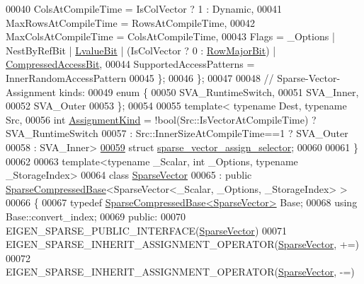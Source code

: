 \begin{DoxyCode}
00040     ColsAtCompileTime = IsColVector ? 1 : Dynamic,
00041     MaxRowsAtCompileTime = RowsAtCompileTime,
00042     MaxColsAtCompileTime = ColsAtCompileTime,
00043     Flags = \_Options | NestByRefBit | \hyperlink{group__flags_gae2c323957f20dfdc6cb8f44428eaec1a}{LvalueBit} | (IsColVector ? 0 : 
      \hyperlink{group__flags_gae4f56c2a60bbe4bd2e44c5b19cbe8762}{RowMajorBit}) | \hyperlink{group__flags_gaed0244284da47a2b8661261431173caf}{CompressedAccessBit},
00044     SupportedAccessPatterns = InnerRandomAccessPattern
00045   \};
00046 \};
00047 
00048 \textcolor{comment}{// Sparse-Vector-Assignment kinds:}
00049 \textcolor{keyword}{enum} \{
00050   SVA\_RuntimeSwitch,
00051   SVA\_Inner,
00052   SVA\_Outer
00053 \};
00054 
00055 \textcolor{keyword}{template}< \textcolor{keyword}{typename} Dest, \textcolor{keyword}{typename} Src,
00056           \textcolor{keywordtype}{int} \hyperlink{struct_eigen_1_1internal_1_1_assignment_kind}{AssignmentKind} = !bool(Src::IsVectorAtCompileTime) ? SVA\_RuntimeSwitch
00057                              : Src::InnerSizeAtCompileTime==1 ? SVA\_Outer
00058                              : SVA\_Inner>
\hyperlink{struct_eigen_1_1internal_1_1sparse__vector__assign__selector}{00059} \textcolor{keyword}{struct }\hyperlink{struct_eigen_1_1internal_1_1sparse__vector__assign__selector}{sparse\_vector\_assign\_selector};
00060 
00061 \}
00062 
00063 \textcolor{keyword}{template}<\textcolor{keyword}{typename} \_Scalar, \textcolor{keywordtype}{int} \_Options, \textcolor{keyword}{typename} \_StorageIndex>
00064 \textcolor{keyword}{class }\hyperlink{group___sparse_core___module_class_eigen_1_1_sparse_vector}{SparseVector}
00065   : \textcolor{keyword}{public} \hyperlink{group___sparse_core___module_class_eigen_1_1_sparse_compressed_base}{SparseCompressedBase}<SparseVector<\_Scalar, \_Options, \_StorageIndex> >
00066 \{
00067     \textcolor{keyword}{typedef} \hyperlink{group___sparse_core___module_class_eigen_1_1_sparse_compressed_base}{SparseCompressedBase<SparseVector>} Base;
00068     \textcolor{keyword}{using} Base::convert\_index;
00069   \textcolor{keyword}{public}:
00070     EIGEN\_SPARSE\_PUBLIC\_INTERFACE(\hyperlink{group___sparse_core___module_class_eigen_1_1_sparse_vector}{SparseVector})
00071     EIGEN\_SPARSE\_INHERIT\_ASSIGNMENT\_OPERATOR(\hyperlink{group___sparse_core___module_class_eigen_1_1_sparse_vector}{SparseVector}, +=)
00072     EIGEN\_SPARSE\_INHERIT\_ASSIGNMENT\_OPERATOR(\hyperlink{group___sparse_core___module_class_eigen_1_1_sparse_vector}{SparseVector}, -=)

\end{DoxyCode}
